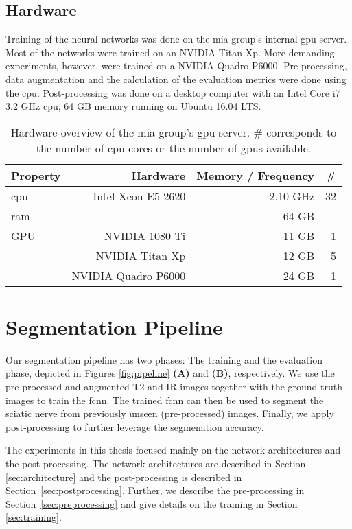 \subsection{Hardware}
Training of the neural networks was done on the \gls{mia} group's internal \gls{gpu} server. Most of the networks were trained on an NVIDIA Titan Xp. More demanding experiments, however, were trained on a NVIDIA Quadro P6000. Pre-processing, data augmentation and the calculation of the evaluation metrics were done using the \gls{cpu}. Post-processing was done on a desktop computer with an Intel Core i7 3.2 GHz \gls{cpu}, 64 GB memory running on Ubuntu 16.04 LTS.
\begin{table}[htbp]
   \centering
   \caption[Hardware]{Hardware overview of the \gls{mia} group's \gls{gpu} server. \# corresponds to the number of \gls{cpu} cores or the number of \gls{gpu}s available.}
   \begin{tabular}{l*{3}{r}}
      \toprule
      Property & Hardware & Memory / Frequency & \# \\
      \midrule
      \acrshort{cpu} & Intel Xeon E5-2620 & 2.10 GHz & 32 \\
      \acrshort{ram} & & 64 GB & \\
      GPU & NVIDIA 1080 Ti & 11 GB & 1 \\
       & NVIDIA Titan Xp & 12 GB & 5 \\
       & NVIDIA Quadro P6000 & 24 GB & 1 \\
      \bottomrule
   \end{tabular}
   \label{tab:cluster}
\end{table}

\section{Segmentation Pipeline}
Our segmentation pipeline has two phases: The training and the evaluation phase, depicted in Figures \ref{fig:pipeline} \textbf{(A)} and \textbf{(B)}, respectively. We use the pre-processed and augmented T2 and IR images together with the ground truth images to train the \gls{fcnn}. The trained \gls{fcnn} can then be used to segment the sciatic nerve from previously unseen (pre-processed) images. Finally, we apply post-processing to further leverage the segmenation accuracy.

The experiments in this thesis focused mainly on the network architectures and the post-processing. The network architectures are described in Section \ref{sec:architecture} and the post-processing is described in Section~\ref{sec:postprocessing}. Further, we describe the pre-processing in Section~\ref{sec:preprocessing} and give details on the training in Section \ref{sec:training}.

